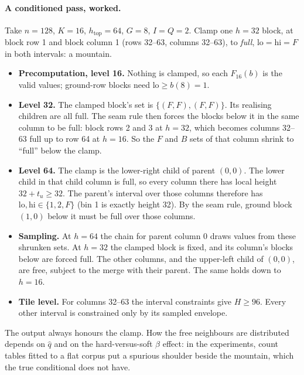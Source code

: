 \documentclass[11pt]{article}
\newcommand{\1}{\mathds{1}}
\begin{document}
\paragraph{A conditioned pass, worked.} Take $n = 128$, $K = 16$, $h_{\text{top}} = 64$,
$G = 8$, $I = Q = 2$. Clamp one $h = 32$ block, at block row 1 and block column 1 (rows 32--63,
columns 32--63), to \emph{full}, $\mathrm{lo} = \mathrm{hi} = F$ in both intervals: a mountain.
\begin{itemize}
  \item \textbf{Precomputation, level 16.} Nothing is clamped, so each $F_{16}(b)$ is the valid
        values; ground-row blocks need $\mathrm{lo} \ge b(8) = 1$.
  \item \textbf{Level 32.} The clamped block's set is $\{(F,F),(F,F)\}$. Its realising children
        are all full. The seam rule then forces the blocks below it in the same column to be
        full: block rows 2 and 3 at $h = 32$, which becomes columns 32--63 full up to row 64 at
        $h = 16$. So the $F$ and $B$ sets of that column shrink to ``full'' below the clamp.
  \item \textbf{Level 64.} The clamp is the lower-right child of parent $(0, 0)$. The lower child
        in that child column is full, so every column there has local height $32 + t_u \ge 32$.
        The parent's interval over those columns therefore has $\mathrm{lo},
        \mathrm{hi} \in \{1, 2, F\}$ (bin 1 is exactly height 32). By the seam rule, ground block
        $(1, 0)$ below it must be full over those columns.
  \item \textbf{Sampling.} At $h = 64$ the chain for parent column 0 draws values from these
        shrunken sets. At $h = 32$ the clamped block is fixed, and its column's blocks below are
        forced full. The other columns, and the upper-left child of $(0, 0)$, are free, subject to
        the merge with their parent. The same holds down to $h = 16$.
  \item \textbf{Tile level.} For columns 32--63 the interval constraints give $H \ge 96$. Every
        other interval is constrained only by its sampled envelope.
\end{itemize}
The output always honours the clamp. How the free neighbours are distributed depends on $\hat
q$ and on the hard-versus-soft $\beta$ effect: in the experiments, count tables fitted to a flat
corpus put a spurious shoulder beside the mountain, which the true conditional does not have.
\end{document}

